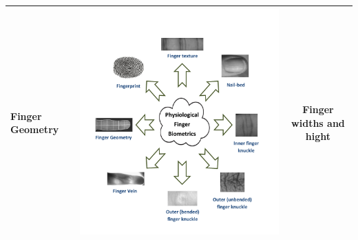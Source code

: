 \documentclass[review]{elsarticle}
\begin{document}
\begin{table}[h]
{\begin{tabular}{|C{3.7cm}|C{3.7cm}|c|}
			\textbf{Finger Geometry} & \begin{minipage}{0.75\hsize}\includegraphics[page=1,scale=.5,trim=2cm 13.5cm 20cm 14cm,clip]{Finger_biometrics.pdf}\end{minipage} & Finger widths and hight \\ \hline

\end{tabular}}
\end{table}
\end{document}
